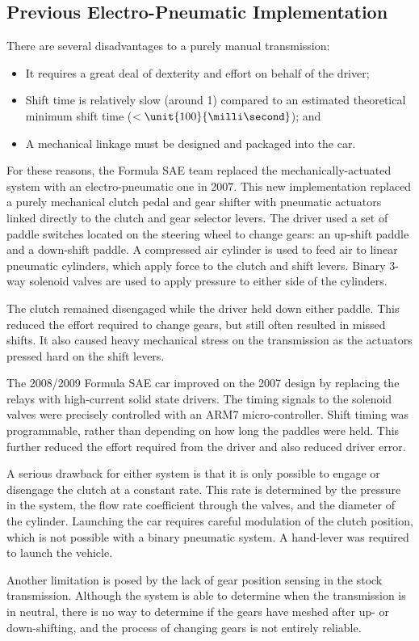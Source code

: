 \subsection{Previous Electro-Pneumatic Implementation}

There are several disadvantages to a purely manual transmission:

\begin{itemize}

\item It requires a great deal of dexterity and effort on behalf of the driver;

\item Shift time is relatively slow (around \unit{1}{\second}) compared to an estimated theoretical minimum shift time ($<\unit{100}{\milli\second}$); and 

\item A mechanical linkage must be designed and packaged into the car.

\end{itemize}

For these reasons, the Formula SAE team replaced the mechanically-actuated system with an electro-pneumatic one in 2007. This new implementation replaced a purely mechanical clutch pedal and gear shifter with pneumatic actuators linked directly to the clutch and gear selector levers. The driver used a set of paddle switches located on the steering wheel to change gears: an up-shift paddle and a down-shift paddle. A compressed air cylinder is used to feed air to linear pneumatic cylinders, which apply force to the clutch and shift levers. Binary 3-way solenoid valves are used to apply pressure to either side of the cylinders. 

The clutch remained disengaged while the driver held down either paddle. This reduced the effort required to change gears, but still often resulted in missed shifts. It also caused heavy mechanical stress on the transmission as the actuators pressed hard on the shift levers.

The 2008/2009 Formula SAE car improved on the 2007 design by replacing the relays with high-current solid state drivers. The timing signals to the solenoid valves were precisely controlled with an ARM7 micro-controller. Shift timing was programmable, rather than depending on how long the paddles were held. This further reduced the effort required from the driver and also reduced driver error. 

A serious drawback for either system is that it is only possible to engage or disengage the clutch at a constant rate. This rate is determined by the pressure in the system, the flow rate coefficient through the valves, and the diameter of the cylinder. Launching the car requires careful modulation of the clutch position, which is not possible with a binary pneumatic system. A hand-lever was required to launch the vehicle.

Another limitation is posed by the lack of gear position sensing in the stock transmission. Although the system is able to determine when the transmission is in neutral, there is no way to determine if the gears have meshed after up- or down-shifting, and the process of changing gears is not entirely reliable. 
